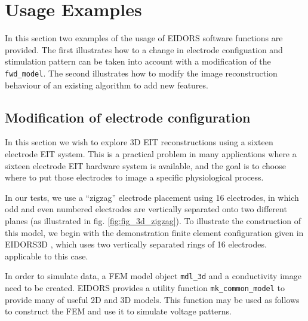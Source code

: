 \documentclass[12pt]{iopart}
\begin{document}
\section{ Usage Examples}

In this section two examples of the usage of EIDORS
software functions are provided. The first illustrates
how to a change in electrode configuation and stimulation 
pattern can be taken
into account with a modification of the {\tt fwd\_model}.
The second illustrates how to modify the image reconstruction
behaviour of an existing algorithm to
add new features.

\subsection{Modification of electrode configuration}

In this section we wish to explore 3D EIT reconstructions
using a sixteen electrode EIT system. This is a practical
problem in many applications where a sixteen electrode
EIT hardware system is available, and the goal is to 
choose where to put those electrodes to image a specific
physiological process.

In our tests, we use a ``zigzag'' electrode placement 
using 16 electrodes, in which odd and even numbered
electrodes are vertically separated onto two different
planes (as illustrated in fig. \ref{fig:fig_3d_zigzag}).
To illustrate the construction of this model, we begin
with the demonstration finite element configuration
given in EIDORS3D \cite{Polydorides_and_Lionheart_2002},
which uses two vertically separated rings of 16 electrodes.
applicable to this case.

In order to simulate data, a FEM model object {\tt mdl\_3d}
and a conductivity image need to be created.
EIDORS provides a utility function {\tt mk\_common\_model}
to provide many of useful 2D and 3D models. This function
may be used as follows to construct the FEM and use it
to simulate voltage patterns.
\end{document}
